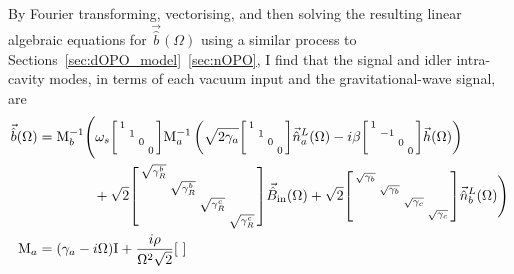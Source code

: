 By Fourier transforming, vectorising, and then solving the resulting linear algebraic equations for $\vec{\hat b}(\Omega)$ using a similar process to Sections~\ref{sec:dOPO_model}~\ref{sec:nOPO}, I find that the signal and idler intra-cavity modes, in terms of each vacuum input and the gravitational-wave signal, are 
\begin{align}\label{eq:nIS_vecb}
\vec{\hat{b}}(\Omega)&= \mathrm{M}_b^{-1}\Biggl(\omega_s\begin{bsmallmatrix}
1 &  &  &  \\
 & 1 &  &  \\
 &  & 0 &  \\
 &  &  & 0
\end{bsmallmatrix}\mathrm{M}_a^{-1}\left(\sqrt{2\gamma_a}\begin{bsmallmatrix}
1 &  &  &  \\
 & 1 &  &  \\
 &  & 0 &  \\
 &  &  & 0
\end{bsmallmatrix}\vec{\hat{n}}^L_a(\Omega)-i\beta\begin{bsmallmatrix}
1 &  &  &  \\
 & -1 &  &  \\
 &  & 0 &  \\
 &  &  & 0
\end{bsmallmatrix}\vec{h}(\Omega)\right)\\&\hspace{1.4cm}+ \sqrt{2}\begin{bsmallmatrix}
\sqrt{\gamma^b_R} &  &  &  \\
 & \sqrt{\gamma^b_R} &  &  \\
 &  & \sqrt{\gamma^c_R} &  \\
 &  &  & \sqrt{\gamma^c_R}
\end{bsmallmatrix}\vec{\hat B}_\mathrm{in}(\Omega) + \sqrt{2}\begin{bsmallmatrix}
\sqrt{\gamma_b} &  &  &  \\
 & \sqrt{\gamma_b} &  &  \\
 &  & \sqrt{\gamma_c} &  \\
 &  &  & \sqrt{\gamma_c}
\end{bsmallmatrix}\vec{\hat n}^L_b(\Omega)\Biggr)\nonumber\\
\mathrm{M}_a &= (\gamma_a-i\Omega)\mathrm{I}+\frac{i\rho}{\Omega^2 \sqrt{2}}\begin{bsmallmatrix}

\end{bsmallmatrix}
\end{align}

